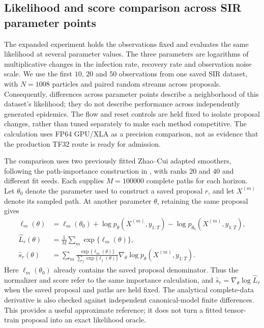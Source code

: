 \subsection{Likelihood and score comparison across SIR parameter points}
The expanded experiment holds the observations fixed and evaluates the same
likelihood at several parameter values. The three parameters are logarithms
of multiplicative changes in the infection rate, recovery rate and observation
noise scale. We use the first $10$, $20$ and $50$ observations from one saved
SIR dataset, with $N=1008$ particles and paired random streams across proposals.
Consequently, differences across parameter points describe a neighborhood of
this dataset's likelihood; they do not describe performance across independently
generated epidemics. The flow and reset controls are held fixed to isolate
proposal changes, rather than tuned separately to make each method competitive.
The calculation uses FP64 GPU/XLA as a precision comparison, not as evidence
that the production TF32 route is ready for admission.

The comparison uses two previously fitted Zhao--Cui adapted smoothers, following
the path-importance construction in \citet[eq.~(26), Algorithm~4]{zhao2024tensor}, with
ranks $20$ and $40$ and different fit seeds. Each supplies $M=100000$ complete
paths for each horizon. Let $\theta_0$ denote the parameter used to construct a
saved proposal $r$, and let $X^{(m)}$ denote its sampled path. At another
parameter $\theta$, retaining the same proposal gives
\begin{align}
 \ell_m(\theta)
 &=\ell_m(\theta_0)
   +\log p_\theta(X^{(m)},y_{1:T})
   -\log p_{\theta_0}(X^{(m)},y_{1:T}),\\
 \widehat L_r(\theta)&=\frac1M\sum_m\exp\{\ell_m(\theta)\},\\
 \widehat s_r(\theta)&=
 \sum_m\frac{\exp\{\ell_m(\theta)\}}
              {\sum_j\exp\{\ell_j(\theta)\}}
       \nabla_\theta\log p_\theta(X^{(m)},y_{1:T}).
\end{align}
Here $\ell_m(\theta_0)$ already contains the saved proposal denominator.
Thus the normalizer and score refer to the same importance calculation, and
$\widehat s_r=\nabla_\theta\log\widehat L_r$ when the saved proposal and paths
are held fixed. The analytical complete-data derivative is also checked against
independent canonical-model finite differences. This provides a useful
approximate reference; it does not turn a fitted tensor-train proposal into
an exact likelihood oracle.

